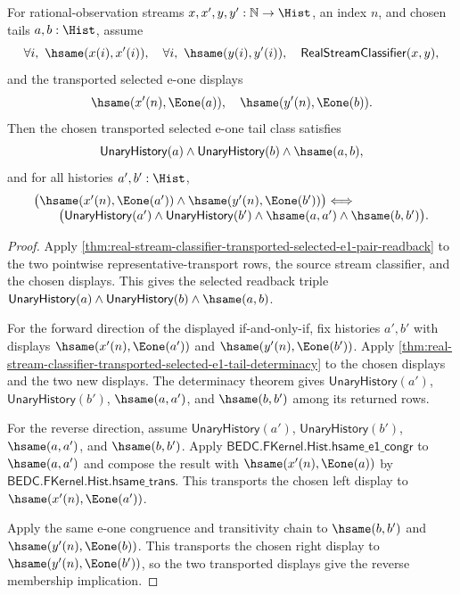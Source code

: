 \begin{theorem}
\label{thm:real-stream-classifier-transported-selected-tail-class-exactness}
For rational-observation streams $x,x',y,y':\mathbb{N}\to\Hist$, an index
$n$, and chosen tails $a,b:\Hist$, assume
$$
\forall i,\ \hsame(x(i),x'(i)),\quad
\forall i,\ \hsame(y(i),y'(i)),\quad
\mathsf{RealStreamClassifier}(x,y),
$$
and the transported selected e-one displays
$$
\hsame(x'(n),\Eone(a)),\quad
\hsame(y'(n),\Eone(b)).
$$
Then the chosen transported selected e-one tail class satisfies
$$
\mathsf{UnaryHistory}(a)\land\mathsf{UnaryHistory}(b)\land\hsame(a,b),
$$
and for all histories $a',b':\Hist$,
$$
\begin{array}{l}
\bigl(\hsame(x'(n),\Eone(a'))\land\hsame(y'(n),\Eone(b'))\bigr)
\Longleftrightarrow\\
\qquad
\bigl(\mathsf{UnaryHistory}(a')\land
\mathsf{UnaryHistory}(b')\land
\hsame(a,a')\land
\hsame(b,b')\bigr).
\end{array}
$$
\end{theorem}
\begin{proof}
Apply
\autoref{thm:real-stream-classifier-transported-selected-e1-pair-readback}
to the two pointwise representative-transport rows, the source stream
classifier, and the chosen displays. This gives the selected readback triple
$\mathsf{UnaryHistory}(a)\land\mathsf{UnaryHistory}(b)\land\hsame(a,b)$.

For the forward direction of the displayed if-and-only-if, fix histories
$a',b'$ with displays $\hsame(x'(n),\Eone(a'))$ and
$\hsame(y'(n),\Eone(b'))$. Apply
\autoref{thm:real-stream-classifier-transported-selected-e1-tail-determinacy}
to the chosen displays and the two new displays. The determinacy theorem gives
$\mathsf{UnaryHistory}(a')$, $\mathsf{UnaryHistory}(b')$, $\hsame(a,a')$, and
$\hsame(b,b')$ among its returned rows.

For the reverse direction, assume $\mathsf{UnaryHistory}(a')$,
$\mathsf{UnaryHistory}(b')$, $\hsame(a,a')$, and $\hsame(b,b')$. Apply
$\mathsf{BEDC.FKernel.Hist.hsame\_e1\_congr}$ to $\hsame(a,a')$ and compose the
result with $\hsame(x'(n),\Eone(a))$ by
$\mathsf{BEDC.FKernel.Hist.hsame\_trans}$. This transports the chosen left
display to $\hsame(x'(n),\Eone(a'))$.

Apply the same e-one congruence and transitivity chain to $\hsame(b,b')$ and
$\hsame(y'(n),\Eone(b))$. This transports the chosen right display to
$\hsame(y'(n),\Eone(b'))$, so the two transported displays give the reverse
membership implication.
\end{proof}


